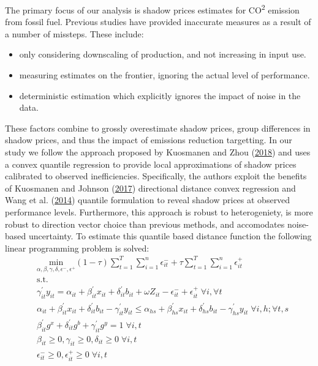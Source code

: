 \documentclass[
  12pt,
]{article}
\providecommand{\tightlist}{%
  \setlength{\itemsep}{0pt}\setlength{\parskip}{0pt}}
\begin{document}
The primary focus of our analysis is shadow prices estimates for CO\textsuperscript{2} emission from fossil fuel. Previous studies have provided inaccurate measures as a result of a number of missteps. These include:

\begin{itemize}
\tightlist
\item
  only considering downscaling of production, and not increasing in input use.
\item
  measuring estimates on the frontier, ignoring the actual level of performance.
\item
  deterministic estimation which explicitly ignores the impact of noise in the data.
\end{itemize}

These factors combine to grossly overestimate shadow prices, group differences in shadow prices, and thus the impact of emissions reduction targetting. In our study we follow the approach proposed by Kuosmanen and Zhou (\protect\hyperlink{ref-Kuosmanen2018b}{2018}) and uses a convex quantile regression to provide local approximations of shadow prices calibrated to observed inefficiencies. Specifically, the authors exploit the benefits of Kuosmanen and Johnson (\protect\hyperlink{ref-Kuosmanen2017}{2017}) directional distance convex regression and Wang et al. (\protect\hyperlink{ref-Wang2014}{2014}) quantile formulation to reveal shadow prices at observed performance levels. Furthermore, this approach is robust to heterogeniety, is more robust to direction vector choice than previous methods, and accomodates noise-based uncertainty. To estimate this quantile based distance function the following linear programming problem is solved:
\begin{equation}
\begin{split}
& \underset{\alpha,\beta,\gamma,\delta,\epsilon^-,\epsilon^+}{\text{min}}
 (1-\tau) \sum^{T}_{t=1} \sum^{n}_{i=1}\epsilon^-_{it} + \tau \sum^{T}_{t=1}  \sum^{n}_{i=1}\epsilon^+_{it}  \\
&\text{s.t.} \\
&\gamma^{'}_{it}y_{it}=\alpha_{it}+\beta^{'}_{it}x_{it}+\delta^{'}_{it}b_{it} + \omega Z_{it} -\epsilon^-_{it}+\epsilon^+_{it} \; \forall i ,\forall t \\
&\alpha_{it}+\beta^{'}_{it}x_{it}+\delta^{'}_{it}b_{it}-\gamma^{'}_{it}y_{it} \leq \alpha_{hs}+\beta^{'}_{hs}x_{it}+\delta^{'}_{hs}b_{it}-\gamma^{'}_{hs}y_{it} \; \forall i,h ; \forall t,s \\
& \beta^{'}_{it}g^x+\delta^{'}_{it}g^b+\gamma^{'}_{it}g^y=1 \; \forall i,t\\
& \beta_{it} \geq0,\gamma_{it} \geq0,\delta_{it} \geq0 \; \forall i,t \\
& \epsilon^-_{it} \geq0, \epsilon^+_{it} \geq 0 \; \forall i,t
\end{split}
\label{eq:QCNLS}
\end{equation}
\end{document}
